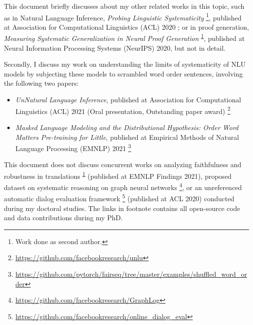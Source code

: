 \documentclass[12pt]{article}
\begin{document}
This document briefly discusses about my other related works in this topic, such as in Natural Language Inference, \textit{Probing Linguistic Systematicity} \footnote{\label{footnote:second}Work done as second author.}, published at Association for Computational Linguistics (ACL) 2020 \cite{goodwin2020}; or in proof generation, \textit{Measuring Systematic Generalization in Neural Proof Generation} \cite{gontier2020} \textsuperscript{\ref{footnote:second}}, published at Neural Information Processing Systems (NeurIPS) 2020, but not in detail.

Secondly, I discuss my work on understanding the limits of systematicity of NLU models by subjecting these models to scrambled word order sentences, involving the following two papers:

\begin{itemize}
  \item \textit{UnNatural Language Inference}, published at Association for Computational Linguistics (ACL) 2021 (Oral presentation, Outstanding paper award) \cite{sinha2021} \footnote{\href{https://github.com/facebookresearch/unlu}{https://github.com/facebookresearch/unlu}}
  \item \textit{Masked Language Modeling and the Distributional Hypothesis: Order Word Matters Pre-training for Little}, published at Empirical Methods of Natural Language Processing (EMNLP) 2021 \cite{sinha2021a} \footnote{\href{https://github.com/pytorch/fairseq/tree/master/examples/shuffled_word_order}{https://github.com/pytorch/fairseq/tree/master/examples/shuffled\_word\_order}}
\end{itemize}

This document does not discuss concurrent works on analyzing faithfulness and robustness in translations \cite{parthasarathi2021a} \textsuperscript{\ref{footnote:second}} (published at EMNLP Findings 2021), proposed dataset on systematic reasoning on graph neural networks \cite{sinha2020c} \footnote{\href{https://github.com/facebookresearch/GraphLog}{https://github.com/facebookresearch/GraphLog}}, or an unreferenced automatic dialog evaluation framework \cite{sinha2020d} \footnote{\href{https://github.com/facebookresearch/online_dialog_eval}{https://github.com/facebookresearch/online\_dialog\_eval}} (published at ACL 2020) conducted during my doctoral studies. The links in footnote contains all open-source code and data contributions during my PhD.

\end{document}
